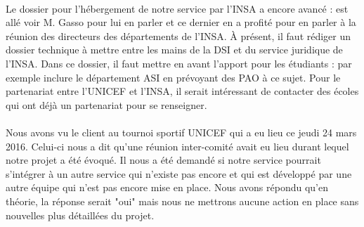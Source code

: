 \documentclass [a4paper] {article}
\begin{document}
\paragraph*{}
Le dossier pour l’hébergement de notre service par l'INSA a encore avancé : \Sergi{} est allé voir M. Gasso pour lui en parler et ce dernier en a profité pour en parler à la réunion des directeurs des départements de l'INSA. À présent, il faut rédiger un dossier technique à mettre entre les mains de la DSI et du service juridique de l'INSA. Dans ce dossier, il faut mettre en avant l'apport pour les étudiants : par exemple inclure le département ASI en prévoyant des PAO à ce sujet. Pour le partenariat entre l'UNICEF et l'INSA, il serait intéressant de contacter des écoles qui ont déjà un partenariat pour se renseigner.

\paragraph*{}
Nous avons vu le client au tournoi sportif UNICEF qui a eu lieu ce jeudi 24 mars 2016. Celui-ci nous a dit qu'une réunion inter-comité avait eu lieu durant lequel notre projet a été évoqué. Il nous a été demandé si notre service pourrait s'intégrer à un autre service qui n'existe pas encore et qui est développé par une autre équipe qui n'est pas encore mise en place. Nous avons répondu qu'en théorie, la réponse serait "oui" mais nous ne mettrons aucune action en place sans nouvelles plus détaillées du projet.

\newpage
\end{document}

